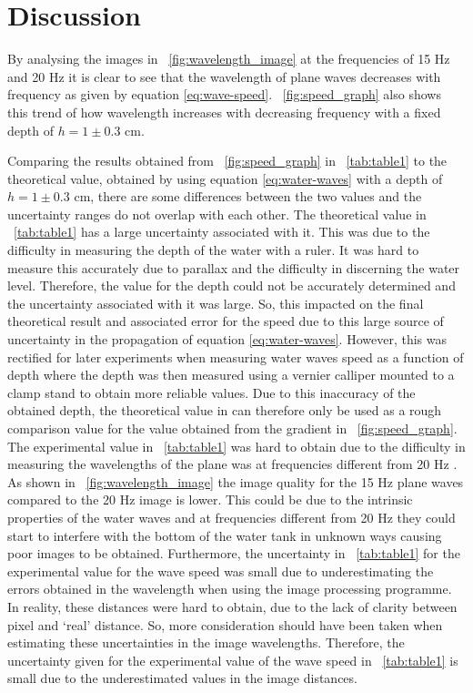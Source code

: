 \documentclass{article}
\newcommand{\figref}[2][\figurename~]{#1\ref{#2}}
\newcommand{\tabref}[2][\tablename~]{#1\ref{#2}}
\begin{document}
\section{Discussion}
\label{sec:discussion}

By analysing the images in \figref{fig:wavelength_image} at the frequencies of 15 Hz and 20 Hz it is clear to see that the wavelength of plane waves decreases with frequency as given by equation \eqref{eq:wave-speed}. \figref{fig:speed_graph} also shows this trend of how wavelength increases with decreasing frequency with a fixed depth of $ h = 1 \pm 0.3$ cm.

\vspace{2mm}
\noindent
Comparing the results obtained from \figref{fig:speed_graph} in \tabref{tab:table1} to the theoretical value, obtained by using equation \eqref{eq:water-waves} with a depth of $h = 1 \pm 0.3$ cm, there are some differences between the two values and the uncertainty ranges do not overlap with each other. The theoretical value in \tabref{tab:table1} has a large uncertainty associated with it. This was due to the difficulty in measuring the depth of the water with a ruler. It was hard to measure this accurately due to parallax and the difficulty in discerning the water level. Therefore, the value for the depth could not be accurately determined and the uncertainty associated with it was large. So, this impacted on the final theoretical result and associated error for the speed due to this large source of uncertainty in the propagation of equation \eqref{eq:water-waves}. However, this was rectified for later experiments when measuring water waves speed as a function of depth where the depth was then measured using a vernier calliper mounted to a clamp stand to obtain more reliable values. Due to this inaccuracy of the obtained depth, the theoretical value in can therefore only be used as a rough comparison value for the value obtained from the gradient in \figref{fig:speed_graph}. The experimental value in \tabref{tab:table1} was hard to obtain due to the difficulty in measuring the wavelengths of the plane was at frequencies different from 20 Hz \cite{Paper01}. As shown in \figref{fig:wavelength_image} the image quality for the 15 Hz plane waves compared to the 20 Hz image is lower. This could be due to the intrinsic properties of the water waves and at frequencies different from 20 Hz they could start to interfere with the bottom of the water tank in unknown ways causing poor images to be obtained. Furthermore, the uncertainty in \tabref{tab:table1} for the experimental value for the wave speed was small due to underestimating the errors obtained in the wavelength when using the image processing programme. In reality, these distances were hard to obtain, due to the lack of clarity between pixel and `real' distance. So, more consideration should have been taken when estimating these uncertainties in the image wavelengths. Therefore, the uncertainty given for the experimental value of the wave speed in \tabref{tab:table1} is small due to the underestimated values in the image distances. 
\end{document}
